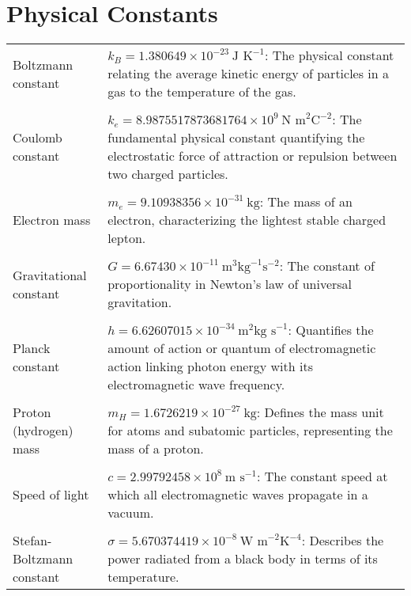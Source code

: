 \documentclass[main.tex]{subfiles}
\begin{document}
\section*{Physical Constants}
\begin{longtable}{p{} p{}}
    Boltzmann constant & $k_B = 1.380649 \times 10^{-23}\ \text{J K}^{-1}$: The physical constant relating the average kinetic energy of particles in a gas to the temperature of the gas. \\\\
    Coulomb constant & $k_e = 8.9875517873681764 \times 10^{9}\ \text{N m}^2\text{C}^{-2}$: The fundamental physical constant quantifying the electrostatic force of attraction or repulsion between two charged particles. \\\\
    Electron mass & $m_e = 9.10938356 \times 10^{-31}\ \text{kg}$: The mass of an electron, characterizing the lightest stable charged lepton. \\\\
    Gravitational constant & $G = 6.67430 \times 10^{-11}\ \text{m}^3\text{kg}^{-1}\text{s}^{-2}$: The constant of proportionality in Newton's law of universal gravitation. \\\\
    Planck constant & $h = 6.62607015 \times 10^{-34}\ \text{m}^2\text{kg s}^{-1}$: Quantifies the amount of action or quantum of electromagnetic action linking photon energy with its electromagnetic wave frequency. \\\\
    Proton (hydrogen) mass & $m_H = 1.6726219 \times 10^{-27}\ \text{kg}$: Defines the mass unit for atoms and subatomic particles, representing the mass of a proton. \\\\
    Speed of light & $c = 2.99792458 \times 10^{8}\ \text{m s}^{-1}$: The constant speed at which all electromagnetic waves propagate in a vacuum. \\\\
    Stefan-Boltzmann constant & $\sigma = 5.670374419 \times 10^{-8}\ \text{W m}^{-2}\text{K}^{-4}$: Describes the power radiated from a black body in terms of its temperature.
\end{longtable}
\end{document}

